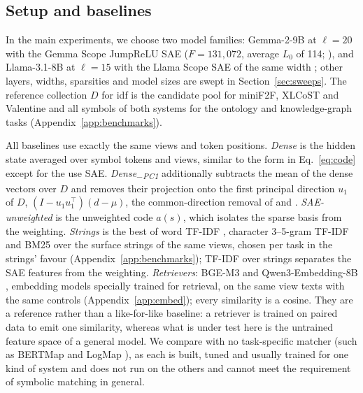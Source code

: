 \documentclass[11pt]{article}
\newcommand{\pcone}{Dense\textsubscript{$-$PC1}\xspace}
\begin{document}
\subsection{Setup and baselines}
\label{sec:baselines}

In the main experiments, we choose two model families: Gemma-2-9B \citep{gemmateam2024gemma2} at $\ell=20$ with the Gemma Scope JumpReLU SAE ($F=131{,}072$, average $L_0$ of 114; \citealp{lieberum2024gemmascope}), and Llama-3.1-8B \citep{grattafiori2024llama3} at $\ell=15$ with the Llama Scope SAE of the same width \citep{he2024llamascope}; other layers, widths, sparsities and model sizes are swept in Section~\ref{sec:sweeps}.
The reference collection $D$ for idf is the candidate pool for miniF2F, XLCoST and Valentine and all symbols of both systems for the ontology and knowledge-graph tasks (Appendix~\ref{app:benchmarks}).

All baselines use exactly the same views and token positions.
\emph{Dense} is the hidden state averaged over symbol tokens and views, similar to the form in Eq.~\ref{eq:code} except for the use SAE.
\emph{\pcone} additionally subtracts the mean of the dense vectors over $D$ and removes their projection onto the first principal direction $u_1$ of $D$, $(I-u_1u_1^\top)(d-\mu)$, the common-direction removal of \citet{mu2018allbutthetop} and \citet{arora2017simple}.
\emph{SAE-unweighted} is the unweighted code $a(s)$, which isolates the sparse basis from the weighting.
\emph{Strings} is the best of word TF-IDF \citep{sparckjones1972statistical}, character 3--5-gram TF-IDF and BM25 \citep{robertson2009probabilistic} over the surface strings of the same views, chosen per task in the strings' favour (Appendix~\ref{app:benchmarks}); TF-IDF over strings separates the SAE features from the weighting.
\emph{Retrievers}: BGE-M3 \citep{chen2024bge} and Qwen3-Embedding-8B \citep{zhang2025qwen3embedding}, embedding models specially trained for retrieval, on the same view texts with the same controls (Appendix~\ref{app:embed}); every similarity is a cosine. They are a reference rather than a like-for-like baseline: a retriever is trained on paired data to emit one similarity, whereas what is under test here is the untrained feature space of a general model.
We compare with no task-specific matcher (such as BERTMap \citep{he2022bertmap} and LogMap \citep{jimenezruiz2011logmap}), as each is built, tuned and usually trained for one kind of system and does not run on the others and cannot meet the requirement of symbolic matching in general.
\end{document}

